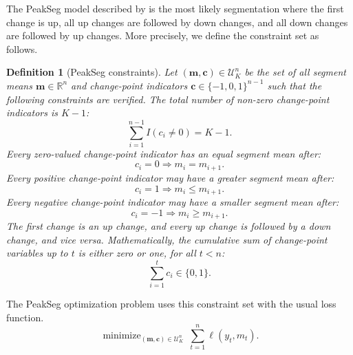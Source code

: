 \documentclass{article}
\newtheorem{definition}{Definition}
\DeclareMathOperator*{\minimize}{minimize}
\newcommand{\RR}{\mathbb R}
\begin{document}
The PeakSeg model described by \citet{HOCKING-PeakSeg} is the most
likely segmentation where the first change is up, all up changes are
followed by down changes, and all down changes are followed by up
changes. More precisely, we define the constraint set as follows.
\begin{definition}[PeakSeg constraints]
  \label{def:U}
  Let $(\mathbf m, \mathbf c)\in\mathcal U_K^n$ be the set of all segment means
  $\mathbf m\in\RR^n$ and change-point indicators
  $\mathbf c\in\{-1, 0,1\}^{n-1}$ such that the following constraints are
  verified. The total number of non-zero change-point indicators is $K-1$:
  \begin{equation}
    \label{eq:U_segments}
    \sum_{i=1}^{n-1} I(c_i \neq 0) = K-1.
  \end{equation}
  Every zero-valued change-point indicator has an equal segment mean
  after:
  \begin{equation}
    \label{eq:U_0}
    c_i = 0 \Rightarrow m_i = m_{i+1}.
  \end{equation}
  Every positive change-point indicator may have a greater segment
  mean after:
  \begin{equation}
    \label{eq:U_1}
    c_i = 1 \Rightarrow m_i \leq m_{i+1}.
  \end{equation}
  Every negative change-point indicator may have a smaller segment
  mean after:
  \begin{equation}
    \label{eq:U-1}
    c_i = -1 \Rightarrow m_i \geq m_{i+1}.
  \end{equation}
  The first change is an up change, and every up change is followed by a
  down change, and vice versa. Mathematically, the cumulative sum of
  change-point variables up to $t$ is either zero or one, for all $t<n$:
  \begin{equation}
    \label{eq:U-cum}
    \sum_{i=1}^t c_i \in \{0, 1\}.
  \end{equation}
\end{definition}
The PeakSeg optimization problem uses this constraint set with the usual loss function. 
\begin{equation}
\label{eq:min_PeakSeg}
    \minimize_{
        (\mathbf m, \mathbf c)\in\mathcal U^n_K
      } \ 
\sum_{t=1}^n \ell(y_t, m_t).
\end{equation}
\end{document}
